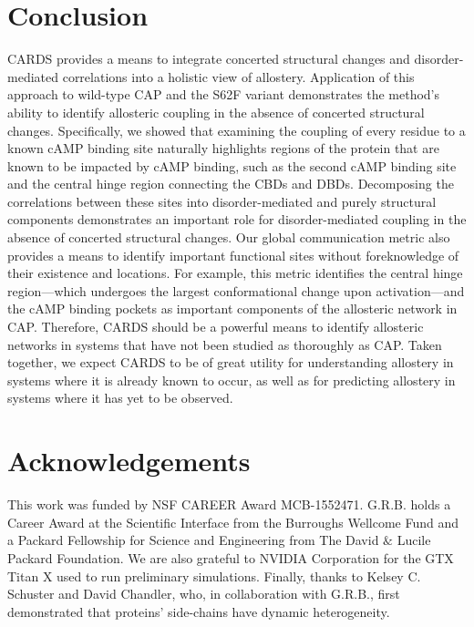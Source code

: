 \documentclass[../main.tex]{subfiles}
\begin{document}
    \section{Conclusion}
        CARDS provides a means to integrate concerted structural changes and disorder-mediated correlations into a holistic view of allostery. Application of this approach to wild-type CAP and the S62F variant demonstrates the method’s ability to identify allosteric coupling in the absence of concerted structural changes. Specifically, we showed that examining the coupling of every residue to a known cAMP binding site naturally highlights regions of the protein that are known to be impacted by cAMP binding, such as the second cAMP binding site and the central hinge region connecting the CBDs and DBDs. Decomposing the correlations between these sites into disorder-mediated and purely structural components demonstrates an important role for disorder-mediated coupling in the absence of concerted structural changes. Our global communication metric also provides a means to identify important functional sites without foreknowledge of their existence and locations. For example, this metric identifies the central hinge region—which undergoes the largest conformational change upon activation—and the cAMP binding pockets as important components of the allosteric network in CAP. Therefore, CARDS should be a powerful means to identify allosteric networks in systems that have not been studied as thoroughly as CAP. Taken together, we expect CARDS to be of great utility for understanding allostery in systems where it is already known to occur, as well as for predicting allostery in systems where it has yet to be observed.

    \section{Acknowledgements}
        This work was funded by NSF CAREER Award MCB-1552471. G.R.B. holds a Career Award at the Scientific Interface from the Burroughs Wellcome Fund and a Packard Fellowship for Science and Engineering from The David $\&$ Lucile Packard Foundation. We are also grateful to NVIDIA Corporation for the GTX Titan X used to run preliminary simulations. Finally, thanks to Kelsey C. Schuster and David Chandler, who, in collaboration with G.R.B., first demonstrated that proteins’ side-chains have dynamic heterogeneity.
\end{document}
